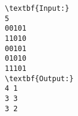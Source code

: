 \begin{verbatim}
\textbf{Input:}
5
00101
11010
00101
01010
11101
\textbf{Output:}
4 1
3 3
3 2\end{verbatim}